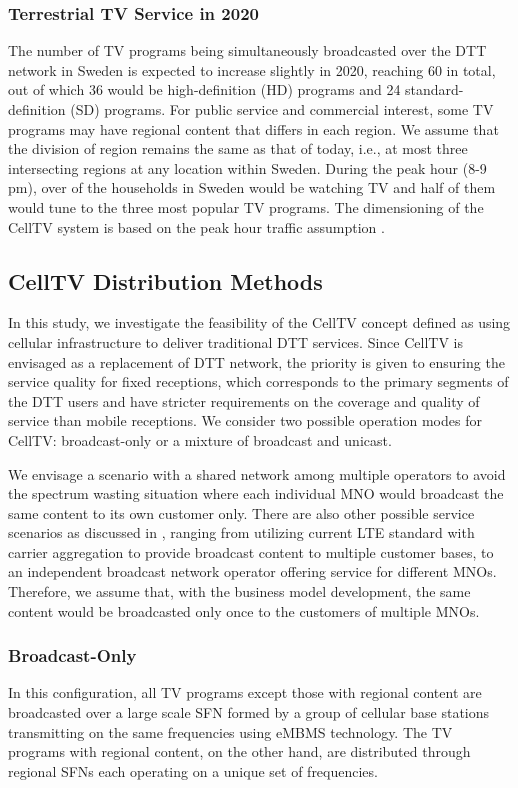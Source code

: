 \documentclass[journal]{IEEEtran}
\begin{document}
\subsubsection{\textbf{Terrestrial TV Service in 2020}}

The number of TV programs being simultaneously broadcasted over the DTT network in Sweden is expected to increase slightly in 2020, reaching 60 in total, out of which 36 would be high-definition (HD) programs and 24 standard-definition (SD) programs. For public service and commercial interest, some TV programs may have regional content that differs in each region. We assume that the division of region remains the same as that of today, i.e., at most three intersecting regions at any location within Sweden. During the peak hour (8-9 pm), over  of the households in Sweden would be watching TV and half of them would tune to the three most popular TV programs. The dimensioning of the CellTV system is based on the peak hour traffic assumption \cite{PTS1}.

\subsection{CellTV Distribution Methods}
In this study, we investigate the feasibility of the CellTV concept defined as using cellular infrastructure to deliver traditional DTT services. Since CellTV is envisaged as a replacement of DTT network, the priority is given to ensuring the service quality for fixed receptions, which corresponds to the primary segments of the DTT users and have stricter requirements on the coverage and quality of service than mobile receptions. We consider two possible operation modes for CellTV: broadcast-only or a mixture of broadcast and unicast.

We envisage a scenario with a shared network among multiple operators to avoid the spectrum wasting situation where each individual MNO would broadcast the same content to its own customer only. There are also other possible service scenarios as discussed in \cite{qualcomm}, ranging from utilizing current LTE standard with carrier aggregation to provide broadcast content to multiple customer bases, to an independent broadcast network operator offering service for different MNOs. Therefore, we assume that, with the business model development, the same content would be broadcasted only once to the customers of multiple MNOs.

\subsubsection{\textbf{Broadcast-Only}}
In this configuration, all TV programs except those with regional content are broadcasted over a large scale SFN formed by a group of cellular base stations transmitting on the same frequencies using eMBMS technology. The TV programs with regional content, on the other hand, are distributed through regional SFNs each operating on a unique set of frequencies.
\end{document}
